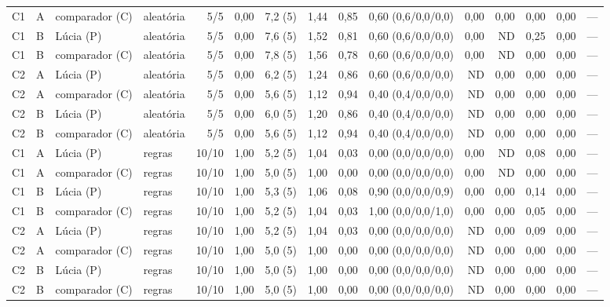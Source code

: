 \begin{tabular}{@{}llllrrrrrlrrrrr@{}}
C1 & A & comparador (C) & aleatória & 5/5 & 0,00 & 7,2 (5) & 1,44 & 0,85 & 0,60 (0,6/0,0/0,0) & 0,00 & 0,00 & 0,00 & 0,00 & --- \\
C1 & B & Lúcia (P) & aleatória & 5/5 & 0,00 & 7,6 (5) & 1,52 & 0,81 & 0,60 (0,6/0,0/0,0) & 0,00 & ND & 0,25 & 0,00 & --- \\
C1 & B & comparador (C) & aleatória & 5/5 & 0,00 & 7,8 (5) & 1,56 & 0,78 & 0,60 (0,6/0,0/0,0) & 0,00 & ND & 0,00 & 0,00 & --- \\
C2 & A & Lúcia (P) & aleatória & 5/5 & 0,00 & 6,2 (5) & 1,24 & 0,86 & 0,60 (0,6/0,0/0,0) & ND & 0,00 & 0,00 & 0,00 & --- \\
C2 & A & comparador (C) & aleatória & 5/5 & 0,00 & 5,6 (5) & 1,12 & 0,94 & 0,40 (0,4/0,0/0,0) & ND & 0,00 & 0,00 & 0,00 & --- \\
C2 & B & Lúcia (P) & aleatória & 5/5 & 0,00 & 6,0 (5) & 1,20 & 0,86 & 0,40 (0,4/0,0/0,0) & ND & 0,00 & 0,00 & 0,00 & --- \\
C2 & B & comparador (C) & aleatória & 5/5 & 0,00 & 5,6 (5) & 1,12 & 0,94 & 0,40 (0,4/0,0/0,0) & ND & 0,00 & 0,00 & 0,00 & --- \\
C1 & A & Lúcia (P) & regras & 10/10 & 1,00 & 5,2 (5) & 1,04 & 0,03 & 0,00 (0,0/0,0/0,0) & 0,00 & ND & 0,08 & 0,00 & --- \\
C1 & A & comparador (C) & regras & 10/10 & 1,00 & 5,0 (5) & 1,00 & 0,00 & 0,00 (0,0/0,0/0,0) & 0,00 & ND & 0,00 & 0,00 & --- \\
C1 & B & Lúcia (P) & regras & 10/10 & 1,00 & 5,3 (5) & 1,06 & 0,08 & 0,90 (0,0/0,0/0,9) & 0,00 & 0,00 & 0,14 & 0,00 & --- \\
C1 & B & comparador (C) & regras & 10/10 & 1,00 & 5,2 (5) & 1,04 & 0,03 & 1,00 (0,0/0,0/1,0) & 0,00 & 0,00 & 0,05 & 0,00 & --- \\
C2 & A & Lúcia (P) & regras & 10/10 & 1,00 & 5,2 (5) & 1,04 & 0,03 & 0,00 (0,0/0,0/0,0) & ND & 0,00 & 0,09 & 0,00 & --- \\
C2 & A & comparador (C) & regras & 10/10 & 1,00 & 5,0 (5) & 1,00 & 0,00 & 0,00 (0,0/0,0/0,0) & ND & 0,00 & 0,00 & 0,00 & --- \\
C2 & B & Lúcia (P) & regras & 10/10 & 1,00 & 5,0 (5) & 1,00 & 0,00 & 0,00 (0,0/0,0/0,0) & ND & 0,00 & 0,00 & 0,00 & --- \\
C2 & B & comparador (C) & regras & 10/10 & 1,00 & 5,0 (5) & 1,00 & 0,00 & 0,00 (0,0/0,0/0,0) & ND & 0,00 & 0,00 & 0,00 & --- \\
\bottomrule
\end{tabular}
